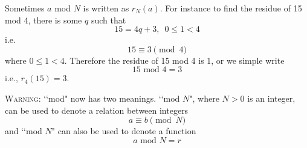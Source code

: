 Sometimes $a$ mod $N$ is written as $r_N(a)$.
For instance to find the residue of 15 mod 4, there is some $q$ such that
\[
15 = 4q + 3, \,\,\, 0 \leq 1 < 4
\]
i.e.
\[
15 \equiv 3 \pmod{4}
\]
where $0 \leq 1 < 4$.
Therefore the residue of 15 mod 4 is 1, or we simple write
\[
15 \text{ mod } 4 = 3
\]
i.e., $r_4(15) = 3$.

\textsc{Warning}: \lq\lq mod" now has two meanings.
\lq\lq mod $N$", where $N > 0$ is an integer,
can be used to denote a relation between integers
\[
a \equiv b \pmod{N}
\]
and \lq\lq mod $N$" can also be used to denote a function
\[
a \text{ mod } N = r
\]


